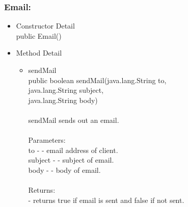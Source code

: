 \documentclass[letterpaper]{article}
\begin{document}
						\subsubsection*{Email:}
						\vspace{0.1in}	
							\begin{itemize}
								\item	Constructor Detail \\
										public Email()
								\item	Method Detail
										\begin{itemize}
											\item	sendMail \\
													public boolean sendMail(java.lang.String to, \\
				               java.lang.String subject, \\
				               java.lang.String body) \\ \\
													sendMail sends out an email. \\ \\
													Parameters: \\
													to - - email address of client.	\\
													subject - - subject of email. \\
													body - - body of email. \\ \\
													Returns: \\
													- returns true if email is sent and false if not sent.
										\end{itemize}
							\end{itemize}
							
							\vspace{0.2in}
\end{document}

